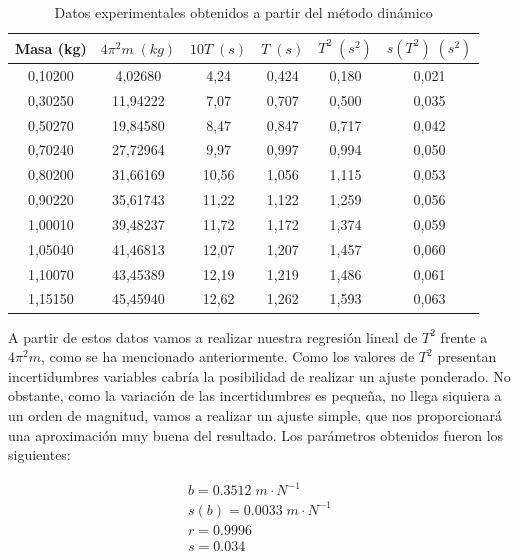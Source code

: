 \documentclass[a4paper,12pt,titlepage]{article}
\begin{document}
\newpage

\begin{table}[h!]
    \centering
    \begin{tabular}{|c|c|c|c|c|c|}
    \hline
    Masa (kg) & $4\pi^2m \; (kg)$ & $10T \; (s)$ & $T \; (s)$ & $T^2 \; (s^2) $&   $s(T^2) \; (s^2)$\\ \hline
    0,10200 & 4,02680  & 4,24  & 0,424 & 0,180 & 0,021 \\ \hline
    0,30250 & 11,94222 & 7,07  & 0,707 & 0,500 & 0,035 \\ \hline
    0,50270 & 19,84580 & 8,47  & 0,847 & 0,717 & 0,042 \\ \hline
    0,70240 & 27,72964 & 9,97  & 0,997 & 0,994 & 0,050 \\ \hline
    0,80200 & 31,66169 & 10,56 & 1,056 & 1,115 & 0,053 \\ \hline
    0,90220 & 35,61743 & 11,22 & 1,122 & 1,259 & 0,056 \\ \hline
    1,00010 & 39,48237 & 11,72 & 1,172 & 1,374 & 0,059 \\ \hline
    1,05040 & 41,46813 & 12,07 & 1,207 & 1,457 & 0,060 \\ \hline
    1,10070 & 43,45389 & 12,19 & 1,219 & 1,486 & 0,061 \\ \hline
    1,15150 & 45,45940 & 12,62 & 1,262 & 1,593 & 0,063 \\ \hline
    \end{tabular}
    \caption{Datos experimentales obtenidos a partir del método dinámico}
    \label{Datos dinamico}
    \end{table}

A partir de estos datos vamos a realizar nuestra regresión lineal de $T^2$ frente a $4\pi^2m$, como se ha mencionado anteriormente. Como los valores de $T^2$ presentan incertidumbres variables cabría la posibilidad de realizar un ajuste ponderado. No obstante, como la variación de las incertidumbres es pequeña, no llega siquiera a un orden de magnitud, vamos a realizar un ajuste simple, que nos proporcionará una aproximación muy buena del resultado. Los parámetros obtenidos fueron los siguientes:

\begin{equation}
    \begin{gathered}
        b = 0.3512 \; m\cdot N^{-1}\\
        s(b) = 0.0033 \; m\cdot N^{-1}\\
        r =  0.9996 \\
        s =  0.034
    \end{gathered}
\end{equation}
\end{document}
